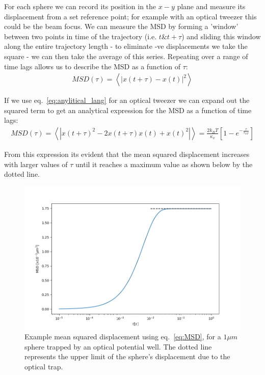 For each sphere we can record its position in the $x-y$ plane and 
measure its displacement from a set reference point; for example 
with an optical tweezer this could be the beam focus. We can measure 
the MSD by forming a 'window' between two points in time of the 
trajectory (i.e. $t \&  t+\tau$) and sliding this window along the 
entire trajectory length - to eliminate -ve displacements we take 
the square - we can then take the average of this series. Repeating 
over a range of time lags allows us to describe the MSD as a function 
of $\tau$:
\begin{align}
	MSD(\tau) = \left<|x(t+\tau) - x(t)|^2\right>
\end{align}

If we use eq.~\ref{eq:anylitical_lang} for an optical tweezer we can 
expand out the squared term to get an analytical expression for the 
MSD as a function of time lags:
\begin{align}
	\label{eq:MSD}
	MSD(\tau) = \left<|x(t+\tau)^2-2x(t+\tau)x(t)+x(t)^2|\right> = \frac{2k_BT}{\kappa_x}\left[1-e^{-\frac{\tau}{\tau_{OT}}}\right]
\end{align}

From this expression its evident that the mean squared displacement 
increases with larger values of $\tau$ until it reaches a maximum 
value as shown below by the dotted line.
\begin{figure}[h!]
	\centering
	\includegraphics[width=\linewidth]{MSD.png}
	\caption{Example mean squared displacement using eq.~\ref{eq:MSD}, for a $1\mu m$ sphere trapped by an optical potential well. The dotted line represents the upper limit of the sphere's displacement due to the optical trap.}
\end{figure}

